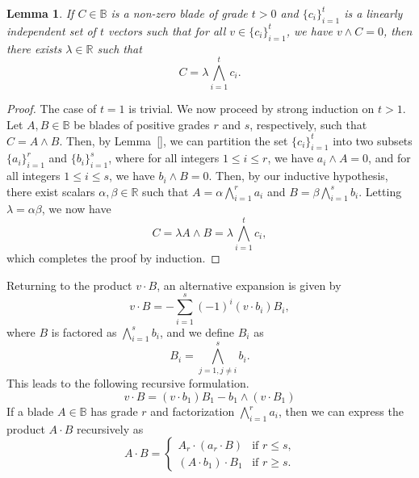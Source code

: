 \documentclass{birkjour}
\newtheorem{lem}[thm]{Lemma}
\theoremstyle{definition}
\theoremstyle{remark}
\numberwithin{equation}{section}
\newcommand{\R}{\mathbb{R}}
\newcommand{\B}{\mathbb{B}}
\begin{document}
\begin{lem}
If $C\in\B$ is a non-zero blade of grade $t>0$ and $\{c_i\}_{i=1}^t$ is a linearly
independent set of $t$ vectors such that for all $v\in\{c_i\}_{i=1}^t$, we have
$v\wedge C=0$, then there exists $\lambda\in\R$ such that
\begin{equation*}
C = \lambda\bigwedge_{i=1}^t c_i.
\end{equation*}
\end{lem}
\begin{proof}
The case of $t=1$ is trivial.  We now proceed by strong induction on $t>1$.
Let $A,B\in\B$ be blades of positive grades $r$ and $s$, respectively, such
that $C=A\wedge B$.  Then, by Lemma~\ref{}, we can partition the set $\{c_i\}_{i=1}^t$
into two subsets $\{a_i\}_{i=1}^r$ and $\{b_i\}_{i=1}^s$, where for all
integers $1\leq i\leq r$, we have $a_i\wedge A=0$, and for all integers $1\leq i\leq s$,
we have $b_i\wedge B=0$.  Then, by our inductive hypothesis, there exist scalars $\alpha,\beta\in\R$
such that $A=\alpha\bigwedge_{i=1}^r a_i$ and $B=\beta\bigwedge_{i=1}^s b_i$.
Letting $\lambda=\alpha\beta$, we now have
\begin{equation*}
C = \lambda A\wedge B=\lambda\bigwedge_{i=1}^t c_i,
\end{equation*}
which completes the proof by induction.
\end{proof}

Returning to the product $v\cdot B$, an alternative expansion is given by
\begin{equation*}
v\cdot B = -\sum_{i=1}^s (-1)^i(v\cdot b_i)B_i,
\end{equation*}
where $B$ is factored as $\bigwedge_{i=1}^s b_i$, and we define $B_i$ as
\begin{equation*}
B_i = \bigwedge_{j=1,j\neq i}^s b_i.
\end{equation*}
This leads to the following recursive formulation.
\begin{equation*}
v\cdot B=(v\cdot b_1)B_1-b_1\wedge(v\cdot B_1)
\end{equation*}
If a blade $A\in\B$ has grade $r$ and factorization $\bigwedge_{i=1}^r a_i$, then
we can express the product $A\cdot B$ recursively as
\begin{equation*}
A\cdot B = \left\{\begin{array}{ll}
A_r\cdot (a_r\cdot B) & \mbox{if $r\leq s$,} \\
(A\cdot b_1)\cdot B_1 & \mbox{if $r\geq s$.}
\end{array}\right.
\end{equation*}
\end{document}
